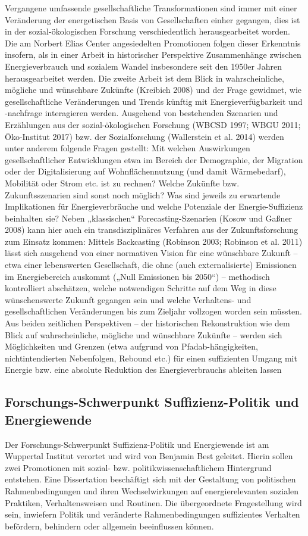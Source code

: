 \documentclass[a4paper,11pt,twoside]{scrartcl}
\begin{document}
Vergangene umfassende gesellschaftliche Transformationen sind immer mit einer Veränderung der energetischen Basis von Gesellschaften einher gegangen, dies ist in der sozial-ökologischen Forschung verschiedentlich herausgearbeitet worden. Die am Norbert Elias Center angesiedelten Promotionen folgen dieser Erkenntnis insofern, als in einer Arbeit in historischer Perspektive Zusammenhänge zwischen Energieverbrauch und sozialem Wandel insbesondere seit den 1950er Jahren herausgearbeitet werden. Die zweite Arbeit ist dem Blick in wahrscheinliche, mögliche und wünschbare Zukünfte (Kreibich 2008) und der Frage gewidmet, wie gesellschaftliche Veränderungen und Trends künftig mit Energieverfügbarkeit und -nachfrage interagieren werden. Ausgehend von bestehenden Szenarien und Erzählungen aus der sozial-ökologischen Forschung (WBCSD 1997; WBGU 2011; Öko-Institut 2017) bzw. der Sozialforschung (Wallerstein et al. 2014) werden unter anderem folgende Fragen gestellt: Mit welchen Auswirkungen gesellschaftlicher Entwicklungen etwa im Bereich der Demographie, der Migration oder der Digitalisierung auf Wohnflächennutzung (und damit Wärmebedarf), Mobilität oder Strom etc. ist zu rechnen? Welche Zukünfte bzw. Zukunftsszenarien sind sonst noch möglich? Was sind jeweils zu erwartende Implikationen für Energieverbräuche und welche Potenziale der Energie-Suffizienz beinhalten sie? Neben „klassischen“ Forecasting-Szenarien (Kosow und Gaßner 2008) kann hier auch ein transdisziplinäres Verfahren aus der Zukunftsforschung zum Einsatz kommen: Mittels Backcasting (Robinson 2003; Robinson et al. 2011) lässt sich ausgehend von einer normativen Vision für eine wünschbare Zukunft – etwa einer lebenswerten Gesellschaft, die ohne (auch externalisierte) Emissionen im Energiebereich auskommt („Null Emissionen bis 2050“) – methodisch kontrolliert abschätzen, welche notwendigen Schritte auf dem Weg in diese wünschenswerte Zukunft gegangen sein und welche Verhaltens- und gesellschaftlichen Veränderungen bis zum Zieljahr vollzogen worden sein müssten. 
Aus beiden zeitlichen Perspektiven – der historischen Rekonstruktion wie dem Blick auf wahrscheinliche, mögliche und wünschbare Zukünfte – werden sich Möglichkeiten und Grenzen (etwa aufgrund von Pfadab-hängigkeiten, nichtintendierten Nebenfolgen, Rebound etc.) für einen suffizienten Umgang mit Energie bzw. eine absolute Reduktion des Energieverbrauchs ableiten lassen  

\subsection*{Forschungs-Schwerpunkt Suffizienz-Politik und Energiewende}
Der Forschungs-Schwerpunkt Suffizienz-Politik und Energiewende ist am Wuppertal Institut verortet und wird von Benjamin Best geleitet. Hierin sollen zwei Promotionen mit sozial- bzw. politikwissenschaftlichem Hintergrund entstehen. 
Eine Dissertation beschäftigt sich mit der Gestaltung von politischen Rahmenbedingungen und ihren Wechselwirkungen auf energierelevanten sozialen Praktiken, Verhaltensweisen und Routinen. Die übergeordnete Fragestellung wird sein, inwiefern Politik und veränderte Rahmenbedingungen suffizientes Verhalten befördern, behindern oder allgemein beeinflussen können.
\end{document}
